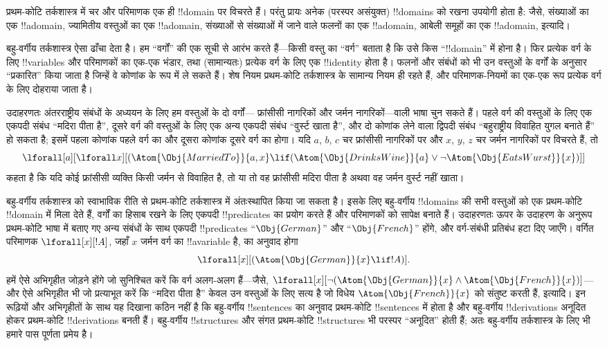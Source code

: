 \documentclass[../../../include/open-logic-section]{subfiles}
\begin{document}


प्रथम-कोटि तर्कशास्त्र में चर और परिमाणक एक ही !!{domain} पर विचरते हैं।
परंतु प्रायः अनेक (परस्पर असंयुक्त) !!{domain}s को रखना उपयोगी होता है: जैसे,
संख्याओं का एक !!a{domain}, ज्यामितीय वस्तुओं का एक !!a{domain}, संख्याओं से
संख्याओं में जाने वाले फलनों का एक !!a{domain}, आबेली समूहों का एक
!!a{domain}, इत्यादि।

बहु-वर्गीय तर्कशास्त्र ऐसा ढाँचा देता है। हम ``वर्गों'' की एक सूची से आरंभ
करते हैं---किसी वस्तु का ``वर्ग'' बताता है कि उसे किस ``!!{domain}'' में
होना है। फिर प्रत्येक वर्ग के लिए !!{variable}s और परिमाणकों का एक-एक भंडार,
तथा (सामान्यतः) प्रत्येक वर्ग के लिए एक !!{identity} होता है। फलनों और संबंधों को भी उन
वस्तुओं के वर्गों के अनुसार ``प्रकारित'' किया जाता है जिन्हें वे कोणांक के
रूप में ले सकते हैं। शेष नियम प्रथम-कोटि तर्कशास्त्र के सामान्य नियम ही
रहते हैं, और परिमाणक-नियमों का एक-एक रूप प्रत्येक वर्ग के लिए दोहराया जाता
है।

उदाहरणतः अंतरराष्ट्रीय संबंधों के अध्ययन के लिए हम वस्तुओं के दो वर्गों---
फ्रांसीसी नागरिकों और जर्मन नागरिकों---वाली भाषा चुन सकते हैं। पहले वर्ग की
वस्तुओं के लिए एक एकपदी संबंध ``मदिरा पीता है'', दूसरे वर्ग की वस्तुओं के
लिए एक अन्य एकपदी संबंध ``वुर्स्ट खाता है'', और दो कोणांक लेने वाला द्विपदी
संबंध ``बहुराष्ट्रीय विवाहित युगल बनाते हैं'' हो सकता है; इसमें पहला कोणांक
पहले वर्ग का और दूसरा कोणांक दूसरे वर्ग का होगा। यदि $a$, $b$, $c$ चर
फ्रांसीसी नागरिकों पर और $x$, $y$, $z$ चर जर्मन नागरिकों पर विचरते हैं, तो
\[
\lforall[a][\lforall x][(\Atom{\Obj{MarriedTo}}{a,x} \lif
(\Atom{\Obj{DrinksWine}}{a} \lor \lnot \Atom{\Obj{EatsWurst}}{x})]]
\]
कहता है कि यदि कोई फ्रांसीसी व्यक्ति किसी जर्मन से विवाहित है, तो या तो वह
फ्रांसीसी मदिरा पीता है अथवा वह जर्मन वुर्स्ट नहीं खाता।

बहु-वर्गीय तर्कशास्त्र को स्वाभाविक रीति से प्रथम-कोटि तर्कशास्त्र में
अंतःस्थापित किया जा सकता है। इसके लिए बहु-वर्गीय !!{domain}s की सभी वस्तुओं
को एक प्रथम-कोटि !!{domain} में मिला देते हैं, वर्गों का हिसाब रखने के लिए
एकपदी !!{predicate}s का प्रयोग करते हैं और परिमाणकों को सापेक्ष बनाते हैं।
उदाहरणतः ऊपर के उदाहरण के अनुरूप प्रथम-कोटि भाषा में बताए गए अन्य संबंधों
के साथ एकपदी !!{predicate}s ``$\Obj{German}$'' और ``$\Obj{French}$'' होंगे,
और वर्ग-संबंधी प्रतिबंध हटा दिए जाएँगे। वर्गित परिमाणक $\lforall[x][!A]$,
जहाँ $x$ जर्मन वर्ग का !!a{variable} है, का अनुवाद होगा
\[
\lforall[x][(\Atom{\Obj{German}}{x} \lif !A)].
\]
हमें ऐसे अभिगृहीत जोड़ने होंगे जो सुनिश्चित करें कि वर्ग अलग-अलग हैं---जैसे,
$\lforall[x][\lnot (\Atom{\Obj{German}}{x} \land
  \Atom{\Obj{French}}{x})]$---और ऐसे अभिगृहीत भी जो प्रत्याभूत करें कि
``मदिरा पीता है'' केवल उन वस्तुओं के लिए सत्य है जो विधेय
$\Atom{\Obj{French}}{x}$ को संतुष्ट करती हैं, इत्यादि। इन रूढ़ियों और
अभिगृहीतों के साथ यह दिखाना कठिन नहीं है कि बहु-वर्गीय !!{sentence}s का
अनुवाद प्रथम-कोटि !!{sentence}s में होता है और बहु-वर्गीय !!{derivation}s
अनूदित होकर प्रथम-कोटि !!{derivation}s बनती हैं। बहु-वर्गीय !!{structure}s
और संगत प्रथम-कोटि !!{structure}s भी परस्पर ``अनूदित'' होती हैं; अतः
बहु-वर्गीय तर्कशास्त्र के लिए भी हमारे पास पूर्णता प्रमेय है।
\end{document}
